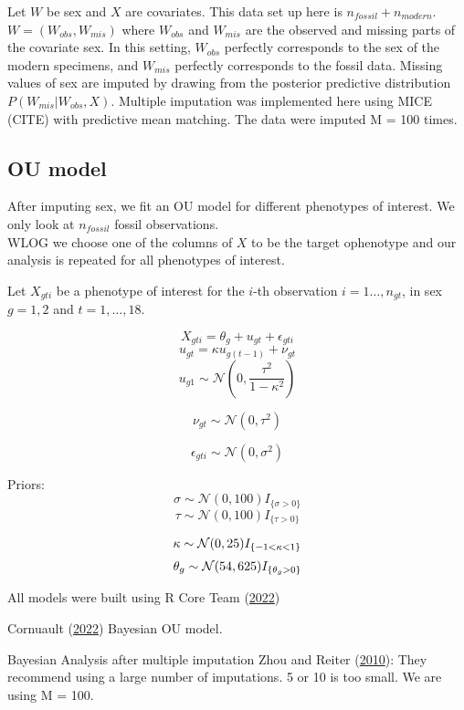 \documentclass[
  12pt,
]{article}
\begin{document}
Let \(W\) be sex and \(X\) are covariates. This data set up here is
\(n_{fossil} + n_{modern}\).\\
\(W = (W_{obs},W_{mis})\) where \(W_{obs}\) and \(W_{mis}\) are the
observed and missing parts of the covariate sex. In this setting,
\(W_{obs}\) perfectly corresponds to the sex of the modern specimens,
and \(W_{mis}\) perfectly corresponds to the fossil data. Missing values
of sex are imputed by drawing from the posterior predictive distribution
\(P(W_{mis}|W_{obs}, X)\). Multiple imputation was implemented here
using MICE (CITE) with predictive mean matching. The data were imputed M
= 100 times.

\hypertarget{ou-model}{%
\subsection{OU model}\label{ou-model}}

After imputing sex, we fit an OU model for different phenotypes of
interest. We only look at \(n_{fossil}\) fossil observations.\\
WLOG we choose one of the columns of \(X\) to be the target ophenotype
and our analysis is repeated for all phenotypes of interest.

Let \(X_{gti}\) be a phenotype of interest for the \(i\)-th observation
\(i = 1\ldots,n_{gt}\), in sex \(g = 1, 2\) and \(t = 1, \ldots, 18\).

\[
X_{gti} = \theta_g + u_{gt} + \epsilon_{gti}
\] \[
u_{gt} = \kappa u_{g(t-1)} + \nu_{gt}
\] \[
u_{g1} \sim \mathcal{N}\left(0,\frac{\tau^2}{1-\kappa^2}\right)
\]

\[
\nu_{gt} \sim \mathcal{N}(0,\tau^2)
\]

\[
\epsilon_{gti} \sim \mathcal{N}(0,\sigma^2)
\]

Priors: \[
\sigma \sim \mathcal{N}(0,100)I_{\{\sigma > 0\}}
\] \[
\tau \sim \mathcal{N}(0,100)I_{\{\tau > 0\}}
\]

\[
\kappa \sim \mathcal{N}(0,25)I_{\{-1 < \kappa < 1\}} \\
\] \[
\theta_g \sim \mathcal{N}(54,625)I_{\{\theta_g > 0\}} \\
\]

All models were built using R Core Team
(\protect\hyperlink{ref-R2022language}{2022})

Cornuault (\protect\hyperlink{ref-Cornault2022}{2022}) Bayesian OU
model.

Bayesian Analysis after multiple imputation Zhou and Reiter
(\protect\hyperlink{ref-ZhouReiter2009}{2010}): They recommend using a
large number of imputations. 5 or 10 is too small. We are using M = 100.
\end{document}
